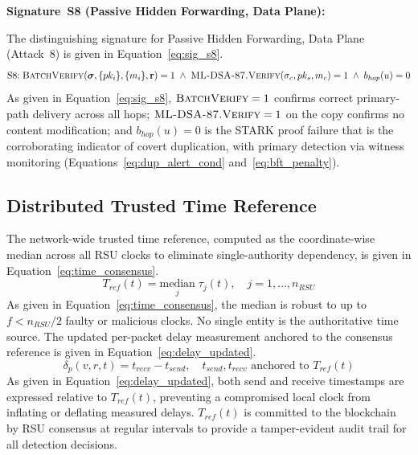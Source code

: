\documentclass[12pt, a4paper]{report}
\begin{document}

\textbf{Signature~S8 (Passive Hidden Forwarding, Data Plane):}


The distinguishing signature for Passive Hidden
Forwarding, Data Plane (Attack~8) is given in
Equation~\eqref{eq:sig_s8}.
\begin{equation}
\text{S8:}\;
\textsc{BatchVerify}(\boldsymbol{\sigma},
\{pk_i\}, \{m_i\}, \mathbf{r}) = 1
\;\land\; \textsc{ML-DSA-87.Verify}(
\sigma_c, pk_s, m_c) = 1
\;\land\; b_{hop}(u) = 0
\label{eq:sig_s8}
\end{equation}
As given in Equation~\eqref{eq:sig_s8},
$\textsc{BatchVerify} = 1$ confirms correct
primary-path delivery across all hops;
$\textsc{ML-DSA-87.Verify} = 1$ on the copy
confirms no content modification; and
$b_{hop}(u) = 0$ is the \ac{STARK} proof failure
that is the corroborating indicator of covert
duplication, with primary detection via witness
monitoring (Equations~\eqref{eq:dup_alert_cond}
and~\eqref{eq:bft_penalty}).


\subsection{Distributed Trusted Time Reference}
\label{sec:time_ref}

The network-wide trusted time reference, computed as the
coordinate-wise median across all \ac{RSU} clocks to
eliminate single-authority dependency, is given in
Equation~\eqref{eq:time_consensus}.
\begin{equation}
T_{ref}(t)=\underset{j}{\text{median}}\;\tau_j(t),
\quad j=1,\ldots,n_{RSU}
\label{eq:time_consensus}
\end{equation}
As given in Equation~\eqref{eq:time_consensus}, the
median is robust to up to $f{<}n_{RSU}/2$ faulty or
malicious clocks. No single entity is the authoritative
time source.
The updated per-packet delay measurement anchored to
the consensus reference is given in
Equation~\eqref{eq:delay_updated}.
\begin{equation}
\delta_p(v,r,t)=t_{recv}-t_{send},\quad
t_{send},t_{recv}\text{ anchored to }T_{ref}(t)
\label{eq:delay_updated}
\end{equation}
As given in Equation~\eqref{eq:delay_updated}, both
send and receive timestamps are expressed relative to
$T_{ref}(t)$, preventing a compromised local clock from
inflating or deflating measured delays. $T_{ref}(t)$ is
committed to the blockchain by \ac{RSU} consensus at
regular intervals to provide a tamper-evident audit
trail for all detection decisions.
\end{document}
